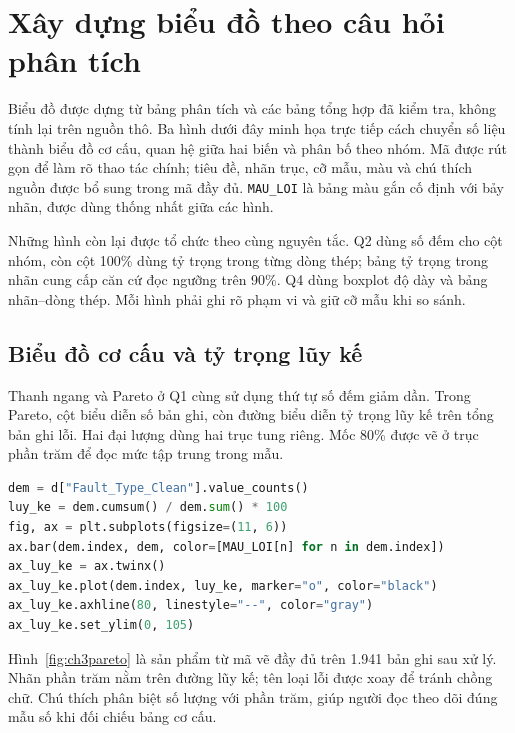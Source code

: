 \documentclass[12pt,a4paper,oneside]{report}
\newcommand{\maCot}[1]{{\urlstyle{tt}\def\UrlBreaks{\do\_\do\/\do\.}\def\UrlBigBreaks{}\nolinkurl{#1}}}
\begin{document}
\section{Xây dựng biểu đồ theo câu hỏi phân tích}

Biểu đồ được dựng từ bảng phân tích và các bảng tổng hợp đã kiểm tra, không tính lại trên nguồn thô. Ba hình dưới đây minh họa trực tiếp cách chuyển số liệu thành biểu đồ cơ cấu, quan hệ giữa hai biến và phân bố theo nhóm. Mã được rút gọn để làm rõ thao tác chính; tiêu đề, nhãn trục, cỡ mẫu, màu và chú thích nguồn được bổ sung trong mã đầy đủ. \maCot{MAU_LOI} là bảng màu gắn cố định với bảy nhãn, được dùng thống nhất giữa các hình.

Những hình còn lại được tổ chức theo cùng nguyên tắc. Q2 dùng số đếm cho cột nhóm, còn cột 100\% dùng tỷ trọng trong từng dòng thép; bảng tỷ trọng trong nhãn cung cấp căn cứ đọc ngưỡng trên 90\%. Q4 dùng boxplot độ dày và bảng nhãn--dòng thép. Mỗi hình phải ghi rõ phạm vi và giữ cỡ mẫu khi so sánh.

\subsection{Biểu đồ cơ cấu và tỷ trọng lũy kế}

Thanh ngang và Pareto ở Q1 cùng sử dụng thứ tự số đếm giảm dần. Trong Pareto, cột biểu diễn số bản ghi, còn đường biểu diễn tỷ trọng lũy kế trên tổng bản ghi lỗi. Hai đại lượng dùng hai trục tung riêng. Mốc 80\% được vẽ ở trục phần trăm để đọc mức tập trung trong mẫu.

\noindent\begin{minipage}{\linewidth}
\begin{lstlisting}[language=Python]
dem = d["Fault_Type_Clean"].value_counts()
luy_ke = dem.cumsum() / dem.sum() * 100
fig, ax = plt.subplots(figsize=(11, 6))
ax.bar(dem.index, dem, color=[MAU_LOI[n] for n in dem.index])
ax_luy_ke = ax.twinx()
ax_luy_ke.plot(dem.index, luy_ke, marker="o", color="black")
ax_luy_ke.axhline(80, linestyle="--", color="gray")
ax_luy_ke.set_ylim(0, 105)
\end{lstlisting}
\end{minipage}\par

Hình~\ref{fig:ch3pareto} là sản phẩm từ mã vẽ đầy đủ trên 1.941 bản ghi sau xử lý. Nhãn phần trăm nằm trên đường lũy kế; tên loại lỗi được xoay để tránh chồng chữ. Chú thích phân biệt số lượng với phần trăm, giúp người đọc theo dõi đúng mẫu số khi đối chiếu bảng cơ cấu.
\end{document}
